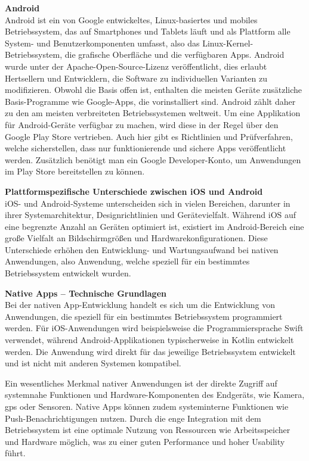 \vspace{0.5em}
\textbf{Android}\\
Android ist ein von Google entwickeltes, Linux-basiertes und mobiles Betriebssystem, das auf Smartphones und Tablets läuft und als Plattform 
alle System- und Benutzerkomponenten umfasst, also das Linux-Kernel-Betriebssystem, die grafische Oberfläche und die verfügbaren Apps. Android 
wurde unter der Apache-Open-Source-Lizenz veröffentlicht, dies erlaubt Hertsellern und Entwicklern, die Software zu individuellen Varianten zu modifizieren. Obwohl die Basis offen ist, enthalten die meisten Geräte zusätzliche Basis-Programme wie Google-Apps, die vorinstalliert sind. 
Android zählt daher zu den am meisten verbreiteten Betriebssystemen weltweit. Um eine Applikation für Android-Geräte verfügbar zu machen, 
wird diese in der Regel über den Google Play Store vertrieben. Auch hier gibt es Richtlinien und Prüfverfahren, welche sicherstellen, dass nur 
funktionierende und sichere Apps veröffentlicht werden. Zusätzlich benötigt man ein Google Developer-Konto, um Anwendungen im Play Store 
bereitstellen zu können. \cite{Featured_Android} \cite{IONOS_Android_App_Entwicklung}

\vspace{0.5em}
\textbf{Plattformspezifische Unterschiede zwischen iOS und Android}\\
iOS- und Android-Systeme unterscheiden sich in vielen Bereichen, darunter in ihrer Systemarchitektur, 
Designrichtlinien und Gerätevielfalt. Während iOS auf eine begrenzte Anzahl an Geräten 
optimiert ist, existiert im Android-Bereich eine große Vielfalt an Bildschirmgrößen und 
Hardwarekonfigurationen. Diese Unterschiede erhöhen den Entwicklung- und Wartungsaufwand 
bei nativen Anwendungen, also Anwendung, welche speziell für ein bestimmtes Betriebssystem entwickelt wurden.

\vspace{0.5em}
\textbf{Native Apps – Technische Grundlagen}\\
Bei der nativen App-Entwicklung handelt es sich um die Entwicklung von Anwendungen, die speziell für ein bestimmtes Betriebssystem programmiert werden. Für iOS-Anwendungen wird beispielsweise die Programmiersprache Swift verwendet, während Android-Applikationen typischerweise in Kotlin entwickelt werden. Die Anwendung wird direkt für das jeweilige Betriebssystem entwickelt und ist nicht mit anderen Systemen kompatibel.

Ein wesentliches Merkmal nativer Anwendungen ist der direkte Zugriff auf systemnahe Funktionen und Hardware-Komponenten des Endgeräts, wie Kamera, \gls{gps} oder Sensoren. Native Apps können zudem systeminterne Funktionen wie Push-Benachrichtigungen nutzen. Durch die enge Integration mit dem Betriebssystem ist eine optimale Nutzung von Ressourcen wie Arbeitsspeicher und Hardware möglich, was zu einer guten Performance und hoher Usability führt.


